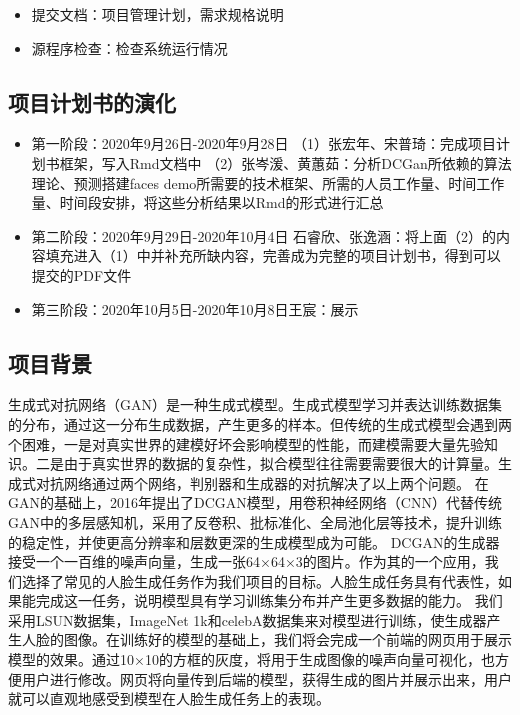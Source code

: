 \documentclass[hyperref, a4paper]{ctexart}
\providecommand{\tightlist}{%
  \setlength{\itemsep}{0pt}\setlength{\parskip}{0pt}}
\begin{document}
\begin{itemize}
\tightlist
\item
  提交文档：项目管理计划，需求规格说明
\item
  源程序检查：检查系统运行情况
\end{itemize}

\hypertarget{ux9879ux76eeux8ba1ux5212ux4e66ux7684ux6f14ux5316}{%
\subsection{项目计划书的演化}\label{ux9879ux76eeux8ba1ux5212ux4e66ux7684ux6f14ux5316}}

\begin{itemize}
\item
  第一阶段：2020年9月26日-2020年9月28日 \newline
  （1）张宏年、宋普琦：完成项目计划书框架，写入Rmd文档中 \newline
  （2）张岑湲、黄蕙茹：分析DCGan所依赖的算法理论、预测搭建faces
  \newline demo所需要的技术框架、所需的人员工作量、时间工作量、时间段安排，将这些分析结果以Rmd的形式进行汇总
\item
  第二阶段：2020年9月29日-2020年10月4日 \newline
  石睿欣、张逸涵：将上面（2）的内容填充进入（1）中并补充所缺内容，完善成为完整的项目计划书，得到可以提交的PDF文件
\item
  第三阶段：2020年10月5日-2020年10月8日\newline 王宸：展示
\end{itemize}

\hypertarget{ux9879ux76eeux80ccux666f}{%
\subsection{项目背景}\label{ux9879ux76eeux80ccux666f}}

生成式对抗网络（GAN）是一种生成式模型。生成式模型学习并表达训练数据集的分布，通过这一分布生成数据，产生更多的样本。但传统的生成式模型会遇到两个困难，一是对真实世界的建模好坏会影响模型的性能，而建模需要大量先验知识。二是由于真实世界的数据的复杂性，拟合模型往往需要需要很大的计算量。生成式对抗网络通过两个网络，判别器和生成器的对抗解决了以上两个问题。
在GAN的基础上，2016年提出了DCGAN模型，用卷积神经网络（CNN）代替传统GAN中的多层感知机，采用了反卷积、批标准化、全局池化层等技术，提升训练的稳定性，并使更高分辨率和层数更深的生成模型成为可能。
DCGAN的生成器接受一个一百维的噪声向量，生成一张64×64×3的图片。作为其的一个应用，我们选择了常见的人脸生成任务作为我们项目的目标。人脸生成任务具有代表性，如果能完成这一任务，说明模型具有学习训练集分布并产生更多数据的能力。
我们采用LSUN数据集，ImageNet
1k和celebA数据集来对模型进行训练，使生成器产生人脸的图像。在训练好的模型的基础上，我们将会完成一个前端的网页用于展示模型的效果。通过10×10的方框的灰度，将用于生成图像的噪声向量可视化，也方便用户进行修改。网页将向量传到后端的模型，获得生成的图片并展示出来，用户就可以直观地感受到模型在人脸生成任务上的表现。
\end{document}
